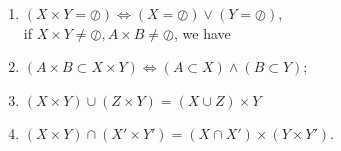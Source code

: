 \begin{tips}
    \begin{enumerate}
        \item $(X\times Y=\oslash)\Leftrightarrow(X=\oslash)\vee(Y=\oslash)$,\\{\rm if} $X\times Y\neq \oslash, A\times B\neq \oslash$, {\rm we have}
        \item $(A\times B\subset X\times Y)\Leftrightarrow(A\subset X)\wedge(B\subset Y)$;
        \item $(X\times Y)\cup (Z\times Y)=(X\cup Z)\times Y$
        \item $(X\times Y)\cap (X'\times Y')=(X\cap X')\times (Y\times Y')$.
    \end{enumerate}
\end{tips}
